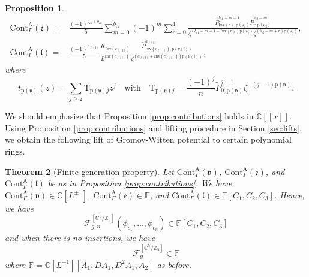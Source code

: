 \documentclass[12pt]{amsart}
\newtheorem{prop}{Proposition}[section]
\newtheorem{thm}[prop]{Theorem}
\numberwithin{equation}{section}
\begin{document}
\begin{prop}
\begin{equation*}
\begin{aligned}
    \mathrm{Cont}_{\Gamma}^{\mathrm{A}}(\mathfrak{e})
    =&\frac{(-1)^{b_{\mathfrak{e}1}+b_{\mathfrak{e}2}}}{5} \sum_{m=0}^{b_{\mathfrak{e}2}}(-1)^{m} \sum_{r=0}^{4}\frac{\widetilde{P}_{\mathrm{Inv}(r),\mathrm{p}(\mathfrak{v}_1)}^{b_{\mathfrak{e}1}+m+1}\widetilde{P}_{r,\mathrm{p}(\mathfrak{v}_2)}^{b_{\mathfrak{e}2}-m}}{\zeta^{(b_{\mathfrak{e}1}+m+1+\mathrm{Inv}(r))\mathrm{p}(\mathfrak{v}_1)}\zeta^{(b_{\mathfrak{e}2}-m+r)\mathrm{p}(\mathfrak{v}_2)}},\\
    \mathrm{Cont}_{\Gamma}^{\mathrm{A}}(\mathfrak{l})
    =&\frac{(-1)^{a_{\ell(\mathfrak{l})}}}{5}\frac{K_{\mathrm{Inv}(c_{\ell(\mathfrak{l})})}}{L^{\mathrm{Inv}(c_{\ell(\mathfrak{l})})}}
    \frac{\widetilde{P}_{\mathrm{Inv}(c_{\ell(\mathfrak{l})}),\mathrm{p}(\nu(\mathfrak{l}))}^{{a_{\ell(\mathfrak{l})}}}}{     \zeta^{({a_{\ell(\mathfrak{l})}}+{\mathrm{Inv}(c_{\ell(\mathfrak{l})})})\mathrm{p}(\nu(\mathfrak{l}))}},
\end{aligned}
\end{equation*}
where
\begin{equation*}
t_{\mathrm{p}(\mathfrak{v})}(z)=\sum_{j\geq{2}}\mathrm{T}_{\mathrm{p}(\mathfrak{v})j}z^j\quad\text{with}\quad \mathrm{T}_{\mathrm{p}(\mathfrak{v})j}=\frac{(-1)^j}{n}\widetilde{P}_{0,\mathrm{p}(\mathfrak{v})}^{j-1}\zeta^{-(j-1)\mathrm{p}(\mathfrak{v})}.
\end{equation*}
\end{prop}
We should emphasize that Proposition \ref{prop:contributions} holds in $\mathbb{C}[[x]]$. Using Proposition \ref{prop:contributions} and lifting procedure in Section \ref{sec:lifts}, we obtain the following lift of Gromov-Witten potential to certain polynomial rings.

\begin{thm}[Finite generation property]\label{thm:vertex_edge_leg_Rings}
Let $\mathrm{Cont}_{\Gamma}^{\mathrm{A}}(\mathfrak{v})$, $\mathrm{Cont}_{\Gamma}^{\mathrm{A}}(\mathfrak{e})$, and $\mathrm{Cont}_{\Gamma}^{\mathrm{A}}(\mathfrak{l})$ be as in Proposition \ref{prop:contributions}. We have $\mathrm{Cont}_{\Gamma}^{\mathrm{A}}(\mathfrak{v})\in\mathbb{C}[L^{\pm 1}]$, $\mathrm{Cont}_{\Gamma}^{\mathrm{A}}(\mathfrak{e})\in\mathbb{F}$, and $\mathrm{Cont}_{\Gamma}^{\mathrm{A}}(\mathfrak{l})\in\mathbb{F}[C_1,C_2,C_3]$. Hence, we have
\begin{equation*}
\mathcal{F}_{g, n}^{\left[\mathbb{C}^{5} / \mathbb{Z}_{5}\right]}\left(\phi_{c_{1}}, \ldots, \phi_{c_{n}}\right)\in\mathbb{F}[C_1,C_2,C_3]
\end{equation*}
and when there is no insertions, we have
\begin{equation*}
\mathcal{F}_{g}^{\left[\mathbb{C}^{5} / \mathbb{Z}_{5}\right]}\in\mathbb{F}
\end{equation*}
where $\mathbb{F}=\mathbb{C}[L^{\pm 1}][A_1,DA_1,D^2A_1,A_2]$ as before.
\end{thm}
\end{document}
